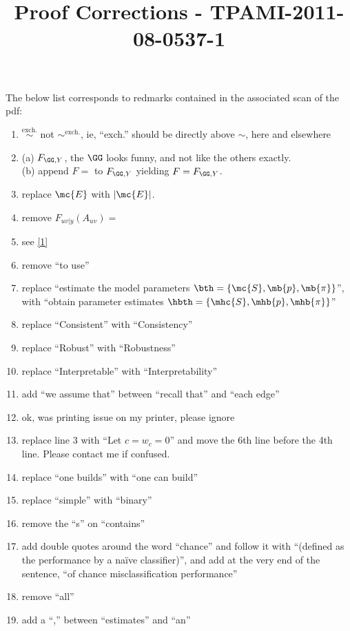 \documentclass[12pt]{article}
\title{\vspace{-75pt}Proof Corrections - TPAMI-2011-08-0537-1}
\date{} \author{}
\begin{document}
\maketitle
\vspace{-50pt}
The below list corresponds to redmarks contained in the associated scan of the pdf:

\begin{enumerate}\itemsep0pt
	\item $\overset{\text{exch.}}{\sim}$ not $\sim^{\text{exch.}}$, ie, ``exch.'' should be directly above $\sim$, here and elsewhere \label{1}
	\item (a) $F_{\GG,Y}$, the $\GG$ looks funny, and not like the others exactly.  \\
	(b) append $F=$ to $F_{\GG,Y}$ yielding $F=F_{\GG,Y}$. 
	\item replace $\mc{E}$ with $|\mc{E}|$.
	\item remove $F_{uv|y}(A_{uv})=$
	\item see \ref{1}
	\item remove ``to use''
	\item replace ``estimate the model parameters $\bth=\{\mc{S},\mb{p},\mb{\pi}\}$'', with  ``obtain parameter estimates $\hbth=\{\mhc{S},\mhb{p},\mhb{\pi}\}$''
	\item replace ``Consistent'' with ``Consistency''
	\item replace ``Robust'' with ``Robustness''
	\item replace ``Interpretable'' with ``Interpretability''
	\item add ``we assume that'' between ``recall that'' and ``each edge''
	\item ok, was printing issue on my printer, please ignore
	\item replace line 3 with ``Let $c=w_c=0$'' and move the 6th line before the 4th line.  Please contact me if confused.
	\item replace ``one builds'' with ``one can build''
	\item replace ``simple'' with ``binary''
	\item remove the ``s'' on ``contains''
	\item add double quotes around the word ``chance'' and follow it with ``(defined as the performance by a na\"ive classifier)'', and add at the very end of the sentence, ``of chance misclassification performance''
	\item remove ``all''
	\item add a ``,'' between ``estimates'' and ``an''

\end{enumerate}
\end{document}
